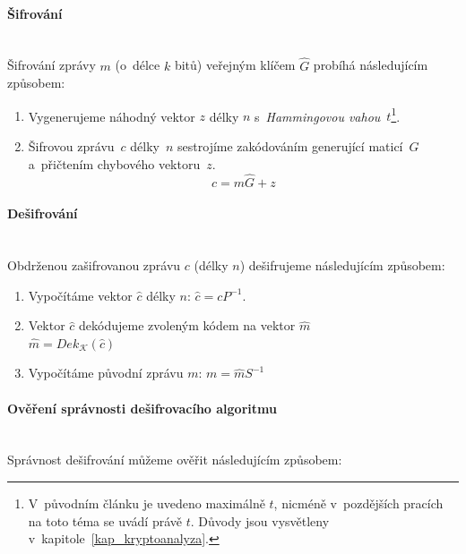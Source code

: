 \documentclass[thesis=M,czech,hidelinks]{FITthesis}[2012/06/26]
\newcommand{\0}{{\textcolor[gray]{0.75}{0}}}
\begin{document}
\paragraph{Šifrování} \hfil \\
Šifrování zprávy $m$ (o~délce $k$ bitů) veřejným klíčem $\hat{G}$ probíhá
následujícím způsobem:

\begin{enumerate}
    \item Vygenerujeme náhodný vektor $z$ délky $n$ s~\emph{Hammingovou
        vahou}~$t$\footnote{
            V~původním článku je uvedeno maximálně $t$, nicméně v~pozdějších
            pracích na toto téma se uvádí právě $t$. Důvody jsou vysvětleny
            v~kapitole~\ref{kap_kryptoanalyza}.
        }.
    \item Šifrovou zprávu~$c$ délky~$n$ sestrojíme zakódováním generující
        maticí~$\hat{G}$ a~přičtením chybového vektoru~$z$.
        $$ c = m \hat{G} + z $$
\end{enumerate}


\paragraph{Dešifrování} \hfil \\
Obdrženou zašifrovanou zprávu $c$ (délky $n$) dešifrujeme následujícím způsobem:

\begin{enumerate}
    \item Vypočítáme vektor $\hat{c}$ délky $n$: $\hat{c} = c P^{-1}$.
    \item Vektor $\hat{c}$ dekódujeme zvoleným kódem na vektor $\hat{m}$ \\
        $\hat{m} = Dek_{\mathcal{K}}\left(\hat{c}\right)$
    \item Vypočítáme původní zprávu $m$: $m = \hat{m} S^{-1}$
\end{enumerate}


\paragraph{Ověření správnosti dešifrovacího algoritmu} \hfil \\
Správnost dešifrování můžeme ověřit následujícím způsobem:
\end{document}
